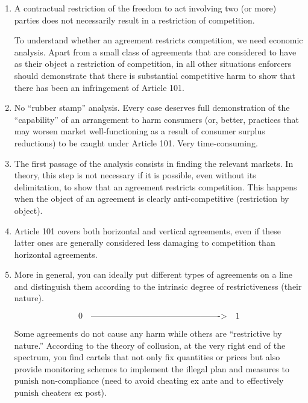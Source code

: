     \begin{enumerate}[label=\alph*.]
        \item A contractual restriction of the freedom to act involving two (or more) parties does not necessarily result in a restriction of competition.
        
        To understand whether an agreement restricts competition, we need economic analysis. Apart from a small class of agreements that are considered to have as their object a restriction of competition, in all other situations enforcers should demonstrate that there is substantial competitive harm to show that there has been an infringement of Article 101.
        
        \item No “rubber stamp” analysis. Every case deserves full demonstration of the ``capability'' of an arrangement to harm consumers (or, better, practices that may worsen market well-functioning as a result of consumer surplus reductions) to be caught under Article 101. Very time-consuming.
        
        \item The first passage of the analysis consists in finding the relevant markets. In theory, this step is not necessary if it is possible, even without its delimitation, to show that an agreement restricts competition. This happens when the object of an agreement is clearly anti-competitive (restriction by object).
        
        \item Article 101 covers both horizontal and vertical agreements, even if these latter ones are generally considered less damaging to competition than horizontal agreements.
        
        \item More in general, you can ideally put different types of agreements on a line and distinguish them according to the intrinsic degree of restrictiveness (their nature).
    
        \[
        0 \quad \text{---------------------------------------------->} \quad 1
        \]
    
        Some agreements do not cause any harm while others are “restrictive by nature.” According to the theory of collusion, at the very right end of the spectrum, you find cartels that not only fix quantities or prices but also provide monitoring schemes to implement the illegal plan and measures to punish non-compliance (need to avoid cheating ex ante and to effectively punish cheaters ex post).
    \end{enumerate}

